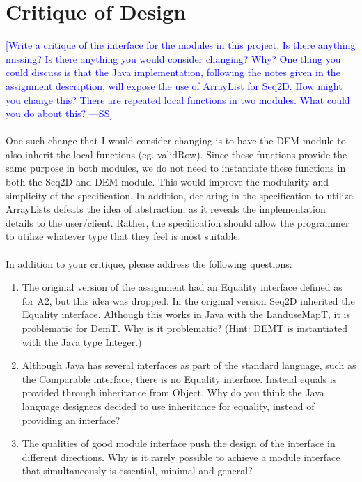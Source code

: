 \documentclass[12pt]{article}
\newcommand{\authornote}[3]{\textcolor{#1}{[#3 ---#2]}}
\newcommand{\authornote}[3]{}
\newcommand{\wss}[1]{\authornote{blue}{SS}{#1}}
\begin{document}
\newpage

\section*{Critique of Design}

\wss{Write a critique of the interface for the modules in this project.  Is there
anything missing?  Is there anything you would consider changing?  Why?  One
thing you could discuss is that the Java implementation, following the notes
given in the assignment description, will expose the use of ArrayList for Seq2D.
 How might you change this?  There are repeated local functions in two modules.
What could you do about this?}\\\\
One such change that I would consider changing is to have the DEM module to also inherit the local functions (eg. validRow).
Since these functions provide the same purpose in both modules, we do not need to instantiate these functions in both the Seq2D and DEM module. 
This would improve the modularity and simplicity of the specification. 
In addition, declaring in the specification to utilize ArrayLists defeats the idea of abstraction, as it reveals the implementation details to the 
user/client. Rather, the specification should allow the programmer to utilize whatever type that they feel is most suitable. \\\\


In addition to your critique, please address the following questions:

\begin{enumerate}
\item The original version of the assignment had an Equality interface defined
  as for A2, but this idea was dropped.  In the original version Seq2D inherited
  the Equality interface.  Although this works in Java with the LanduseMapT, it is
  problematic for DemT.  Why is it problematic?  (Hint: DEMT is instantiated
  with the Java type Integer.)
\item Although Java has several interfaces as part of the standard language,
  such as the Comparable interface, there is no Equality interface.  Instead
  equals is provided through inheritance from Object.  Why do you think the
  Java language designers decided to use inheritance for equality, instead of
  providing an interface?
\item The qualities of good module interface push the design of the interface in
  different directions. Why is it rarely possible to achieve a module interface
  that simultaneously is essential, minimal and general?
\end{enumerate}
\end{document}
